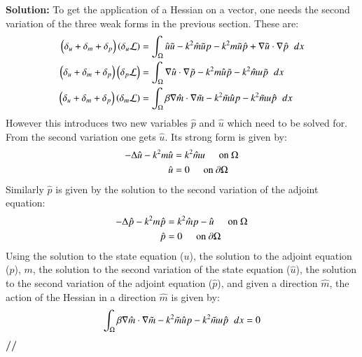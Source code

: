 \documentclass[11pt]{article}
\newenvironment{solution}{\begin{trivlist}\item[]{\bf Solution:}}
                      {\textbf{//} \end{trivlist}}
\begin{document}
\begin{enumerate}
\begin{solution}
To get the application of a Hessian on a vector, one needs the second
 variation of the three weak forms in the previous section. These are: 
\begin{align}
\left(\delta_u+\delta_m+\delta_p\right)\left(\delta_u\mathcal{L}\right)
 &= \int_\Omega \hat{u}\tilde{u} - k^2\hat{m}\tilde{u}p -
 k^2m\tilde{u}\hat{p} + \nabla\tilde{u}\cdot\nabla\hat{p} \hspace{2 mm}
 dx \nonumber \\ 
\left(\delta_u+\delta_m+\delta_p\right)\left(\delta_p\mathcal{L}\right)
 &= \int_\Omega \nabla\hat{u}\cdot\nabla\tilde{p} - k^2m\hat{u}\tilde{p}
 - k^2\hat{m}u\tilde{p} \hspace{2 mm} dx \nonumber \\ 
\left(\delta_u+\delta_m+\delta_p\right)\left(\delta_m\mathcal{L}\right)
 &= \int_\Omega \beta\nabla\hat{m}\cdot\nabla\tilde{m} -
 k^2\tilde{m}\hat{u}p - k^2\tilde{m}u\hat{p} \hspace{2 mm} dx \nonumber 
\end{align}
However this introduces two new variables $\hat{p}$ and $\hat{u}$
 which need to be solved for. From the second variation one gets
 $\hat{u}$. Its strong form is given by:  
\begin{align}
-\Delta\hat{u}-k^2m\hat{u} &= k^2\hat{m}u \hspace{5 mm} \text{on }
 \Omega \nonumber \\ 
\hat{u} &= 0 \hspace{5 mm} \text{on } \partial\Omega \nonumber
\end{align}
Similarly $\hat{p}$ is given by the solution to the second variation of the adjoint equation:
\begin{align}
-\Delta\hat{p} - k^2m\hat{p} &= k^2\hat{m}p - \hat{u}\hspace{5 mm} \text{on } \Omega \nonumber \\
\hat{p} &= 0 \hspace{5 mm} \text{on } \partial\Omega \nonumber
\end{align}
Using the solution to the state equation ($u$), the solution to the
 adjoint equation ($p$), $m$, the solution to the second variation of
 the state equation ($\hat{u}$), the solution to the second variation of
 the adjoint equation ($\hat{p}$), and given a direction $\hat{m}$, the
 action of the Hessian in a direction $\hat{m}$ is given by: 
\begin{displaymath}
\int_\Omega \beta\nabla\hat{m}\cdot\nabla\tilde{m} -
 k^2\tilde{m}\hat{u}p - k^2\tilde{m}u\hat{p} \hspace{2 mm} dx = 0 
\end{displaymath}
\end{solution}


\end{enumerate}
\end{document}
